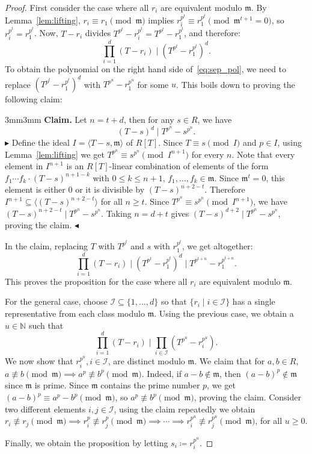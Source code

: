 \documentclass[letterpaper, 11pt, thm-restate]{article}
\numberwithin{equation}{section}
\newcommand{\N}{\mathbb{N}}
\newcommand{\mI}{\mathcal{I}}
\newcommand{\gen}[1]{\langle {#1} \rangle}
\newcommand{\frm}{\mathfrak{m}}
\theoremstyle{definition}
\theoremstyle{definition}
\theoremstyle{definition}
\begin{document}
\begin{proof}
    First consider the case where all $r_i$ are equivalent modulo $\frm$. 
    By Lemma~\ref{lem:lifting}, $r_i\equiv r_1 \pmod{\frm}$ implies $r_i^{p^t}\equiv r_1^{p^t} \pmod{\frm^{t+1}=0}$, so $r_i^{p^t} = r_1^{p^t}$.  
    Now, $T-r_i$ divides $T^{p^t}-r_i^{p^t}=T^{p^t}-r_1^{p^t}$, and therefore:
    \[
    \prod_{i = 1}^d(T-r_i) \;\Big|\; \left(T^{p^t}-r_1^{p^t} \right)^d.
    \]
    To obtain the polynomial on the right hand side of~\eqref{eq:sep_pol}, we need to replace $\left(T^{p^t}-r_1^{p^t} \right)^d$ with $T^{p^u}-r_1^{p^u}$ for some $u$.
    This boils down to proving the following claim:
    \medskip
    \begin{adjustwidth}{3mm}{3mm}
    \textbf{Claim.} Let $n = t+d$, then for any $s \in R$, we have
    \[
    (T-s)^d\mid T^{p^n}-s^{p^n}.
    \]
    \medskip
    \noindent$\blacktriangleright$
    Define the ideal $I=\gen{T-s, \frm}$ of $R[T]$. Since $T\equiv s \pmod{I}$ and $p\in I$, using Lemma~\ref{lem:lifting} we get $T^{p^n}\equiv s^{p^n} \pmod{I^{n+1}}$ for every $n$.
    Note that every element in $I^{n+1}$ is an $R[T]$-linear combination of elements of the form $f_{1} \cdots f_{k} \cdot (T - s)^{n+1-k}$ with $0 \leq k \leq n+1$, $f_1, \ldots, f_k \in \frm$.
    Since $\frm^t=0$, this element is either $0$ or it is divisible by $(T-s)^{n+2-t}$.
    Therefore $I^{n+1} \subseteq \gen{(T-s)^{n+2-t}}$ for all $n \geq t$.
    Since $T^{p^n}\equiv s^{p^n} \pmod{I^{n+1}}$, we have $(T-s)^{n+2-t} \mid T^{p^n}-s^{p^n}$.
    Taking $n = d+t$ gives
    $
    (T-s)^{d+2}\mid T^{p^n}-s^{p^n}
    $, proving the claim.
    \hfill $\blacktriangleleft$
    \end{adjustwidth}
    \medskip

\noindent In the claim, replacing $T$ with $T^{p^t}$ and $s$ with $r_1^{p^t}$, we get altogether: 
\[
\prod_{i = 1}^d (T-r_i) \;\Big|\; \left(T^{p^t}-r_1^{p^t} \right)^d \;\bigg|\; T^{p^{t+n}}-r_1^{p^{t+n}}.
\]
This proves the proposition for the case where all $r_i$ are equivalent modulo $\frm$. 

For the general case, choose $\mI \subseteq\{1,...,d\}$ so that $\{r_i\mid i\in \mI\}$ has a single representative from each class modulo $\frm$. 
Using the previous case, we obtain a $u \in \N$ such that
\[
\prod_{i = 1}^d (T-r_i) \;\Big|\; \prod_{i\in \mI} \left(T^{p^u}-r_i^{p^u} \right).
\]
We now show that $r_i^{p^u}, i\in \mI$, are distinct modulo $\frm$.
We claim that for $a, b \in R$, $a \not\equiv b \pmod{\frm} \implies a^p\not\equiv b^p \pmod{\frm}$.
Indeed, if $a-b\notin \frm$, then $(a-b)^p\notin\frm$ since $\frm$ is prime. Since $\frm$ contains the prime number $p$, we get $(a-b)^p\equiv a^p-b^p \pmod{\frm}$, so $a^p\not\equiv b^p \pmod{\frm}$, proving the claim. 
Consider two different elements $i, j \in \mI$, using the claim repeatedly we obtain $r_i \not\equiv r_j \pmod{\frm} \implies r_i^p \not\equiv r_j^p \pmod{\frm} \implies \cdots \implies r_i^{p^u}\not\equiv r_j^{p^u} \pmod{\frm}$, for all $u \geq 0$.

Finally, we obtain the proposition by letting $s_i \coloneqq r_i^{p^u}$.
\end{proof}
\end{document}
